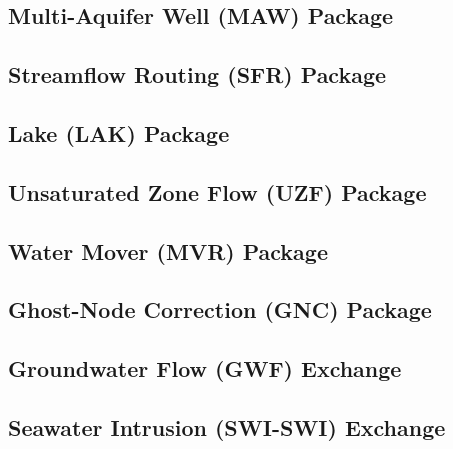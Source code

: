 \newpage
\subsection{Multi-Aquifer Well (MAW) Package}


\newpage
\subsection{Streamflow Routing (SFR) Package}


\newpage
\subsection{Lake (LAK) Package} \label{sec:lakpak}


\newpage
\subsection{Unsaturated Zone Flow (UZF) Package}


\newpage
\subsection{Water Mover (MVR) Package}


\newpage
\subsection{Ghost-Node Correction (GNC) Package}


\newpage
\subsection{Groundwater Flow (GWF) Exchange}


\newpage
\subsection{Seawater Intrusion (SWI-SWI) Exchange}



